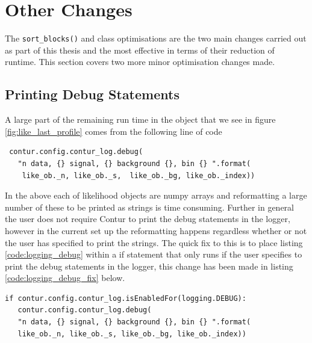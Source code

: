 \section{Other Changes}\label{sec:other_changes}
The \texttt{sort\_blocks()} and  class optimisations are the two main changes carried out as part of this thesis and the most effective in terms of their reduction of runtime. This section covers two more minor optimisation changes made.

\subsection{Printing Debug Statements}
A large part of the remaining run time in the  object that we see in figure \ref{fig:like_last_profile} comes from the following line of code

\begin{code}
\label{code:logging_debug}
\begin{verbatim}
 contur.config.contur_log.debug(
   "n data, {} signal, {} background {}, bin {} ".format(
    like_ob._n, like_ob._s,  like_ob._bg, like_ob._index))
\end{verbatim}
\end{code}

In the above each of likelihood objects are numpy arrays and reformatting a large number of these to be printed as strings is time consuming. Further in general the user does not require Contur to print the debug statements in the logger, however in the current set up the reformatting happens regardless whether or not the user has specified to print the strings. The quick fix to this is to place listing \ref{code:logging_debug} within a if statement that only runs if the user specifies to print the debug statements in the logger, this change has been made in listing \ref{code:logging_debug_fix} below.

\begin{code}
\label{code:logging_debug_fix}
\begin{verbatim}
if contur.config.contur_log.isEnabledFor(logging.DEBUG):
   contur.config.contur_log.debug(
   "n data, {} signal, {} background {}, bin {} ".format(
   like_ob._n, like_ob._s, like_ob._bg, like_ob._index))
\end{verbatim}
\end{code}

